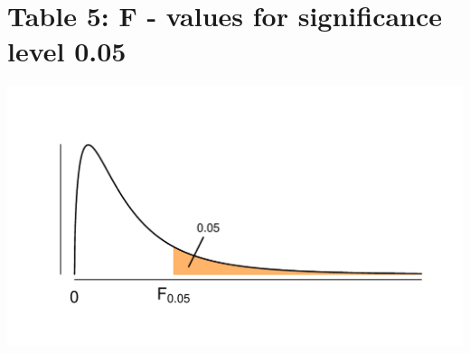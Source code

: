 \section{Table 5: F - values for significance level 0.05}
\label{table5}

\vspace*{-30pt}
\begin{minipage}{0.6\textwidth}
\hfill
\end{minipage}
\begin{minipage}{0.4\textwidth}
\includegraphics[width=\textwidth]{Files/Images/fdist.pdf}
\end{minipage}

